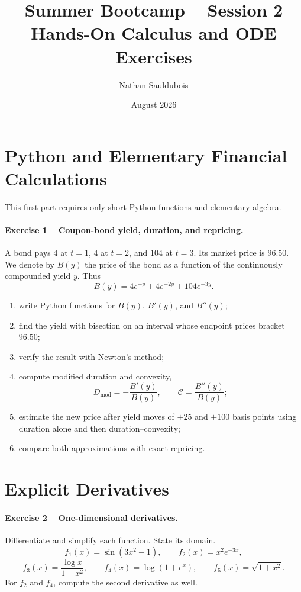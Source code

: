 \documentclass[10pt]{article}
\title{Summer Bootcamp -- Session 2\\Hands-On Calculus and ODE Exercises}
\author{Nathan Sauldubois}
\date{August 2026}
\begin{document}
\maketitle

\section{Python and Elementary Financial Calculations}

This first part requires only short Python functions and elementary algebra.

\paragraph{Exercise 1 -- Coupon-bond yield, duration, and repricing.}
A bond pays $4$ at $t=1$, $4$ at $t=2$, and $104$ at $t=3$. Its market
price is $96.50$. We denote by $B(y)$ the price of the bond as a function of
the continuously compounded yield $y$. Thus
\[
B(y)=4e^{-y}+4e^{-2y}+104e^{-3y}.
\]
\begin{enumerate}
\item write Python functions for $B(y)$, $B'(y)$, and $B''(y)$;
\item find the yield with bisection on an interval whose endpoint prices
bracket $96.50$;
\item verify the result with Newton's method;
\item compute modified duration and convexity,
\[
D_{\mathrm{mod}}=-\frac{B'(y)}{B(y)},
\qquad
\mathcal C=\frac{B''(y)}{B(y)};
\]
\item estimate the new price after yield moves of $\pm25$ and $\pm100$ basis
points using duration alone and then duration--convexity;
\item compare both approximations with exact repricing.
\end{enumerate}

\section{Explicit Derivatives}

\paragraph{Exercise 2 -- One-dimensional derivatives.}
Differentiate and simplify each function. State its domain.
\[
f_1(x)=\sin(3x^2-1),
\qquad
f_2(x)=x^2e^{-3x},
\]
\[
f_3(x)=\frac{\log x}{1+x^2},
\qquad
f_4(x)=\log(1+e^x),
\qquad
f_5(x)=\sqrt{1+x^2}.
\]
For $f_2$ and $f_4$, compute the second derivative as well.
\end{document}
